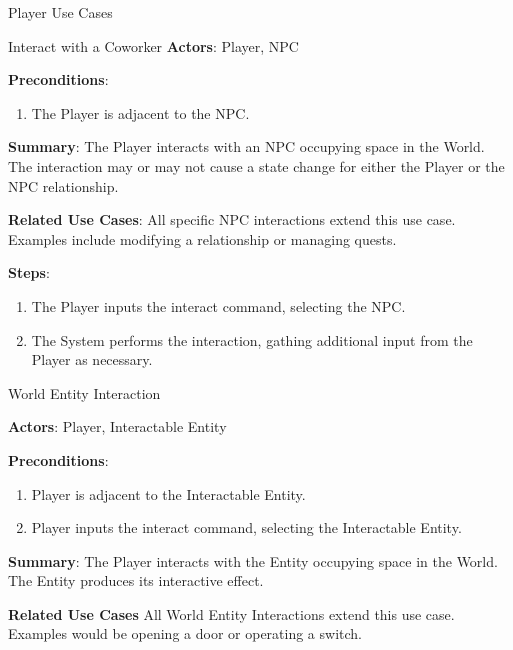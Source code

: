 \documentclass[12pt]{report}
\begin{document}
\begin{section}{Player Use Cases}
\begin{subsection}{Interact with a Coworker}
      \textbf{Actors}:
      Player, NPC

      \textbf{Preconditions}:
      \begin{enumerate}
        \item The Player is adjacent to the NPC.
      \end{enumerate}

      \textbf{Summary}:
      The Player interacts with an NPC occupying space in the World. The
      interaction may or may not cause a state change for either the Player or
      the NPC relationship.

      \textbf{Related Use Cases}:
      All specific NPC interactions extend this use case. Examples include
      modifying a relationship or managing quests.

      \textbf{Steps}:
      \begin{enumerate}
        \item The Player inputs the interact command, selecting the NPC.
        \item The System performs the interaction, gathing additional input from the
	      Player as necessary.
      \end{enumerate}
    \end{subsection}


    \begin{subsection}{World Entity Interaction}

      \textbf{Actors}:
      Player, Interactable Entity

      \textbf{Preconditions}:
      \begin{enumerate}
        \item Player is adjacent to the Interactable Entity.
        \item Player inputs the interact command, selecting the Interactable Entity.
      \end{enumerate}

      \textbf{Summary}:
      The Player interacts with the Entity occupying space in the World. The Entity 
      produces its interactive effect. 

      \textbf{Related Use Cases}
      All World Entity Interactions extend this use case. Examples would be 
      opening a door or operating a switch.


\end{subsection}
\end{section}
\end{document}
